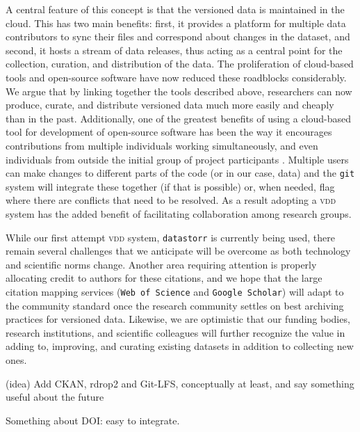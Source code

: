 \documentclass[a4paper,11pt]{article}
\begin{document}
A central feature of this concept is that the versioned data is maintained in the cloud. This has two main benefits: first, it provides a platform for multiple data contributors to sync their files and correspond about changes in the dataset, and second, it hosts a stream of data releases, thus acting as a central point for the collection, curation, and distribution of the data. The proliferation of cloud-based tools and open-source software have now reduced these roadblocks considerably. We argue that by linking together the tools described above, researchers can now produce, curate, and distribute versioned data much more easily and cheaply than in the past. Additionally, one of the greatest benefits of using a cloud-based tool for development of open-source software has been the way it encourages contributions from multiple individuals working simultaneously, and even individuals from outside the initial group of project participants \citep{Rogers-2013}. Multiple users can make changes to different parts of the code (or in our case, data) and the \texttt{git} system will integrate these together (if that is possible) or, when needed, flag where there are conflicts that need to be resolved. As a result adopting a \textsc{vdd} system has the added benefit of facilitating collaboration among research groups.


While our first attempt \textsc{vdd} system, \texttt{datastorr} is currently being used, there remain several challenges that we anticipate will be overcome as both technology and scientific norms change. Another area requiring attention is properly allocating credit to authors for these citations, and we hope that the large citation mapping services (\texttt{Web of Science} and \texttt{Google Scholar}) will adapt to the community standard once the research community settles on best archiving practices for versioned data. Likewise, we are optimistic that our funding bodies, research institutions, and scientific colleagues will further recognize the value in adding to, improving, and curating existing datasets in addition to collecting new ones.

(idea) Add CKAN, rdrop2 and Git-LFS, conceptually at least, and say something useful about the future

Something about DOI: easy to integrate.
\end{document}

